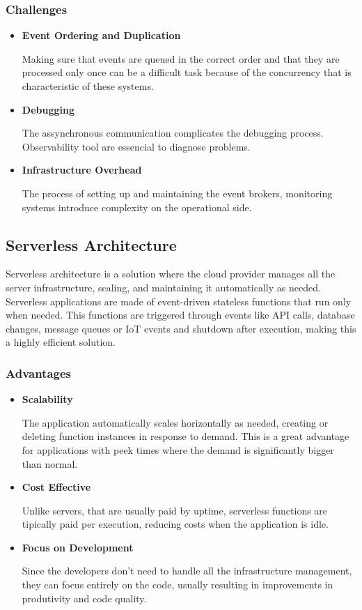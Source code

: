 \subsubsection{Challenges}
\begin{itemize}
	\item \textbf{Event Ordering and Duplication}

	      Making sure that events are queued in the correct order and that they are
	      processed only once can be a difficult task because of the concurrency
	      that is characteristic of these systems.

	\item \textbf{Debugging}

	      The assynchronous communication complicates the debugging process.
	      Observability tool are essencial to diagnose problems.

	\item \textbf{Infrastructure Overhead}

	      The process of setting up and maintaining the event brokers, monitoring
	      systems introduce complexity on the operational side.
\end{itemize}

\subsection{Serverless Architecture}
Serverless architecture is a solution where the cloud provider manages all the
server infrastructure, scaling, and maintaining it automatically as needed.
Serverless applications are made of event-driven stateless functions that run
only when needed. This functions are triggered through events like API calls,
database changes, message queues or IoT events and shutdown after execution,
making this a highly efficient solution.

\subsubsection{Advantages}
\begin{itemize}

	\item \textbf{Scalability}

	      The application automatically scales horizontally as needed, creating or
	      deleting function instances in response to demand. This is a great
	      advantage for applications with peek times where the demand is
	      significantly bigger than normal.

	\item \textbf{Cost Effective}

	      Unlike servers, that are usually paid by uptime, serverless functions are
	      tipically paid per execution, reducing costs when the application is idle.

	\item \textbf{Focus on Development}

	      Since the developers don't need to handle all the infrastructure management,
	      they can focus entirely on the code, usually resulting in improvements in
	      produtivity and code quality.


\end{itemize}

